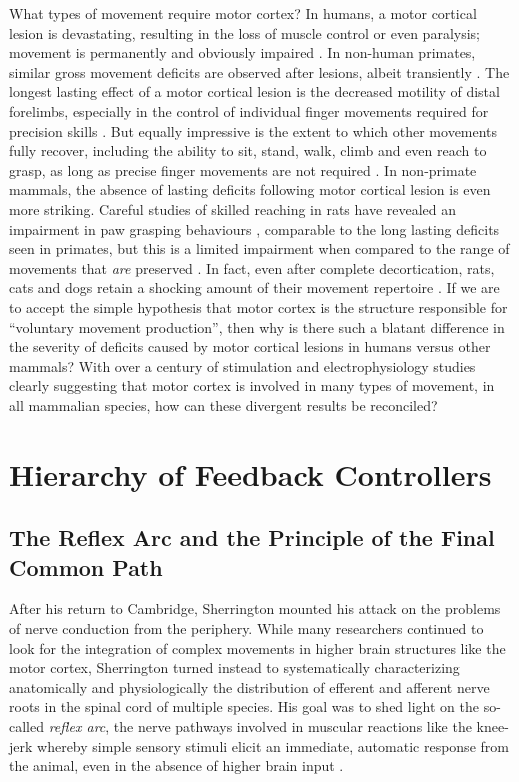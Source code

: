 What types of movement require motor cortex? In humans, a motor cortical lesion is devastating, resulting in the loss of muscle control or even paralysis; movement is permanently and obviously impaired \cite{Laplane1977}. In non-human primates, similar gross movement deficits are observed after lesions, albeit transiently \cite{Leyton1917,Travis1955}. The longest lasting effect of a motor cortical lesion is the decreased motility of distal forelimbs, especially in the control of individual finger movements required for precision skills \cite{Leyton1917,Darling2011}. But equally impressive is the extent to which other movements fully recover, including the ability to sit, stand, walk, climb and even reach to grasp, as long as precise finger movements are not required \cite{Leyton1917,Darling2011,Zaaimi2012}. In non-primate mammals, the absence of lasting deficits following motor cortical lesion is even more striking. Careful studies of skilled reaching in rats have revealed an impairment in paw grasping behaviours \cite{Whishaw1991,Alaverdashvili2008a}, comparable to the long lasting deficits seen in primates, but this is a limited impairment when compared to the range of movements that \emph{are} preserved \cite{Whishaw1991,Kawai2015}. In fact, even after complete decortication, rats, cats and dogs retain a shocking amount of their movement repertoire \cite{Goltz1888,Bjursten1976,Terry1989}. If we are to accept the simple hypothesis that motor cortex is the structure responsible for ``voluntary movement production'', then why is there such a blatant difference in the severity of deficits caused by motor cortical lesions in humans versus other mammals? With over a century of stimulation and electrophysiology studies clearly suggesting that motor cortex is involved in many types of movement, in all mammalian species, how can these divergent results be reconciled?

\section{Hierarchy of Feedback Controllers}

\subsection{The Reflex Arc and the Principle of the Final Common Path}

After his return to Cambridge, Sherrington mounted his attack on the problems of nerve conduction from the periphery. While many researchers continued to look for the integration of complex movements in higher brain structures like the motor cortex, Sherrington turned instead to systematically characterizing anatomically and physiologically the distribution of efferent \cite{Sherrington1892} and afferent \cite{Sherrington1893a} nerve roots in the spinal cord of multiple species. His goal was to shed light on the so-called \emph{reflex arc}, the nerve pathways involved in muscular reactions like the knee-jerk whereby simple sensory stimuli elicit an immediate, automatic response from the animal, even in the absence of higher brain input \cite{Sherrington1893b}.

